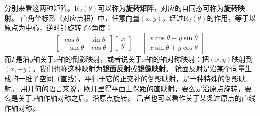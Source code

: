 \documentclass[12pt,UTF8]{ctexbook}
\begin{document}
分别来看这两种矩阵。$\mathrm{R}_2(\theta)$可以称为\textbf{旋转矩阵}，对应的自同态可称为\textbf{旋转映射}。
直角坐标系（对应点积）中，任意向量$(x, y)$，经过$\mathrm{R}_2(\theta)$的作用，等于以原点为中心，逆时针旋转了$\theta$角度：
$$\begin{bmatrix}\cos{\theta} & \sin{\theta} \\ -\sin{\theta} & \cos{\theta}\end{bmatrix} \begin{bmatrix} x \\ y\end{bmatrix} = \begin{bmatrix}x\cos{\theta} - y\sin{\theta} \\ x\sin{\theta} + y\cos{\theta}\end{bmatrix} $$
而$\Gamma$是沿$y$轴关于$x$轴的倒影映射，或者说关于$x$轴的轴对称映射：把$(x,y)$映射到$(x, -y)$。我们也称这种映射为\textbf{镜面反射}或\textbf{镜像映射}。
镜面反射是沿某个向量生成的一维子空间（直线），平行于它的正交补的倒影映射，是一种特殊的倒影映射。
用几何的语言来说，欧几里得平面上保距的直映射，要么是沿原点旋转，要么是关于$x$轴作轴对称之后，沿原点旋转。
后者也可以看作关于某条过原点的直线作轴对称。
\end{document}
